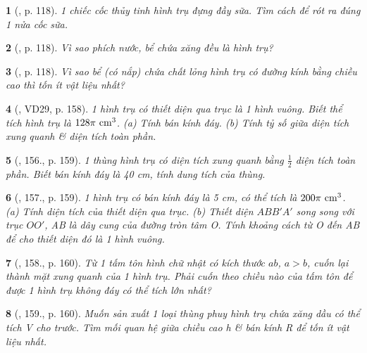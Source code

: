 \documentclass{article}
\newtheorem{baitoan}{}
\begin{document}
\begin{baitoan}[\cite{Binh_boi_duong_Toan_9_tap_2}, p. 118]
	1 chiếc cốc thủy tinh hình trụ đựng đầy sữa. Tìm cách để rót ra đúng 1 nửa cốc sữa.
\end{baitoan}

\begin{baitoan}[\cite{Binh_boi_duong_Toan_9_tap_2}, p. 118]
	Vì sao phích nước, bể chứa xăng đều là hình trụ?
\end{baitoan}

\begin{baitoan}[\cite{Binh_boi_duong_Toan_9_tap_2}, p. 118]
	Vì sao bể (có nắp) chứa chất lỏng hình trụ có đường kính bằng chiều cao thì tốn ít vật liệu nhất?
\end{baitoan}

\begin{baitoan}[\cite{Tuyen_Toan_9_old}, VD29, p. 158]
	1 hình trụ có thiết diện qua trục là 1 hình vuông. Biết thể tích hình trụ là $128\pi\ {\rm cm}^3$. (a) Tính bán kính đáy. (b) Tính tỷ số giữa diện tích xung quanh \& diện tích toàn phần.
\end{baitoan}

\begin{baitoan}[\cite{Tuyen_Toan_9_old}, 156., p. 159]
	1 thùng hình trụ có diện tích xung quanh bằng $\frac{1}{2}$ diện tích toàn phần. Biết bán kính đáy là {\rm40 cm}, tính dung tích của thùng.
\end{baitoan}

\begin{baitoan}[\cite{Tuyen_Toan_9_old}, 157., p. 159]
	1 hình trụ có bán kính đáy là {\rm5 cm}, có thể tích là $200\pi\ {\rm cm}^3$. (a) Tính diện tích của thiết diện qua trục. (b) Thiết diện $ABB'A'$ song song với trục $OO'$, AB là dây cung của đường tròn tâm O. Tính khoảng cách từ O đến AB để cho thiết diện đó là 1 hình vuông.
\end{baitoan}

\begin{baitoan}[\cite{Tuyen_Toan_9_old}, 158., p. 160]
	Từ 1 tấm tôn hình chữ nhật có kích thước $ab$, $a > b$, cuốn lại thành mặt xung quanh của 1 hình trụ. Phải cuốn theo chiều nào của tấm tôn để được 1 hình trụ không đáy có thể tích lớn nhất?
\end{baitoan}

\begin{baitoan}[\cite{Tuyen_Toan_9_old}, 159., p. 160]
	Muốn sản xuất 1 loại thùng phuy hình trụ chứa xăng dầu có thể tích V cho trước. Tìm mối quan hệ giữa chiều cao h \& bán kính R để tốn ít vật liệu nhất.
\end{baitoan}
\end{document}
